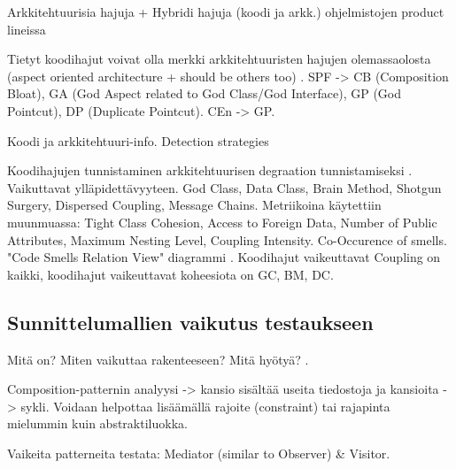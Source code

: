 \documentclass[finnish]{tktltiki2}
\theoremstyle{definition}
\theoremstyle{remark}
\begin{document}
Arkkitehtuurisia hajuja + Hybridi hajuja (koodi ja arkk.) ohjelmistojen product lineissa \citep{vale_bad_2014}

Tietyt koodihajut voivat olla merkki arkkitehtuuristen hajujen olemassaolosta (aspect oriented architecture + should be others too) \citep[s. 47]{macia_impact_2011}. SPF -> CB (Composition Bloat), GA (God Aspect related to God Class/God Interface), GP (God Pointcut), DP (Duplicate Pointcut). CEn -> GP. 


Koodi ja arkkitehtuuri-info. Detection strategies \citep[s. 179-182]{macia_enhancing_2013}


Koodihajujen tunnistaminen arkkitehtuurisen degraation tunnistamiseksi \citep{fontana_towards_2015}. Vaikuttavat ylläpidettävyyteen. God Class, Data Class, Brain Method, Shotgun Surgery, Dispersed Coupling, Message Chains. Metriikoina käytettiin muunmuassa: Tight Class Cohesion, Access to Foreign Data, Number of Public Attributes, Maximum Nesting Level, Coupling Intensity. Co-Occurence of smells. "Code Smells Relation View" diagrammi \citep[s. 5]{fontana_towards_2015}. Koodihajut vaikeuttavat Coupling on kaikki, koodihajut vaikeuttavat koheesiota on GC, BM, DC. 







\subsection{Sunnittelumallien vaikutus testaukseen}

Mitä on? Miten vaikuttaa rakenteeseen? Mitä  hyötyä? \citep{baudry_measuring_2003}.


Composition-patternin analyysi -> kansio sisältää useita tiedostoja ja kansioita -> sykli. Voidaan helpottaa lisäämällä rajoite (constraint) tai rajapinta mielummin kuin abstraktiluokka. 

Vaikeita patterneita testata: Mediator (similar to Observer) \& Visitor.
\end{document}
